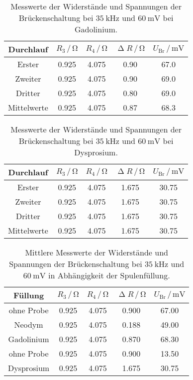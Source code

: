 \begin{table}[H]
  \centering
  \caption{Messwerte der Widerstände und Spannungen der Brückenschaltung bei $\SI{35}{\kilo\hertz}$ und $\SI{60}{\milli\volt}$ bei Gadolinium.}
  \label{tab:abmProben}
  \begin{tabular}{c| c c c c}
    \toprule
    Durchlauf & $R_3 \,/\, \si{\ohm}$ & $R_4 \,/\, \si{\ohm}$ & $\upDelta R \,/\, \si{\ohm}$ & $U_{\text{Br}} \,/\, \si{\milli\volt}$ \\
    \midrule
    Erster & 0.925 & 4.075 & 0.90 & 67.0 \\
    Zweiter & 0.925 & 4.075 & 0.90 & 69.0 \\
    Dritter & 0.925 & 4.075 & 0.80 & 69.0 \\
    Mittelwerte & 0.925 & 4.075 & 0.87 & 68.3\\
    \bottomrule
  \end{tabular}
\end{table}

\begin{table}[H]
  \centering
  \caption{Messwerte der Widerstände und Spannungen der Brückenschaltung bei $\SI{35}{\kilo\hertz}$ und $\SI{60}{\milli\volt}$ bei Dysprosium.}
  \label{tab:abmProben}
  \begin{tabular}{c| c c c c}
    \toprule
    Durchlauf & $R_3 \,/\, \si{\ohm}$ & $R_4 \,/\, \si{\ohm}$ & $\upDelta R \,/\, \si{\ohm}$ & $U_{\text{Br}} \,/\, \si{\milli\volt}$ \\
    \midrule
    Erster & 0.925 & 4.075 & 1.675 & 30.75 \\
    Zweiter & 0.925 & 4.075 & 1.675 & 30.75 \\
    Dritter & 0.925 & 4.075 & 1.675 & 30.75 \\
    Mittelwerte & 0.925 & 4.075 & 1.675 & 30.75 \\
    \bottomrule
  \end{tabular}
\end{table}


\begin{table}[H]
  \centering
  \caption{Mittlere Messwerte der Widerstände und Spannungen der Brückenschaltung bei $\SI{35}{\kilo\hertz}$ und $\SI{60}{\milli\volt}$ in Abhängigkeit der Spulenfüllung.}
  \label{tab:abmProben}
  \begin{tabular}{c| c c c c}
    \toprule
    Füllung & $R_3 \,/\, \si{\ohm}$ & $R_4 \,/\, \si{\ohm}$ & $\upDelta R \,/\, \si{\ohm}$ & $U_{\text{Br}} \,/\, \si{\milli\volt}$ \\
    \midrule
    ohne Probe & 0.925 & 4.075 & 0.900 & 67.00 \\
    Neodym & 0.925 & 4.075 & 0.188 & 49.00\\ 
    Gadolinium & 0.925 & 4.075 & 0.870 & 68.30\\ \hline
    ohne Probe & 0.925 & 4.075 & 0.900 & 13.50 \\
    Dysprosium & 0.925 & 4.075 & 1.675 & 30.75 \\
    \bottomrule
  \end{tabular}
\end{table}